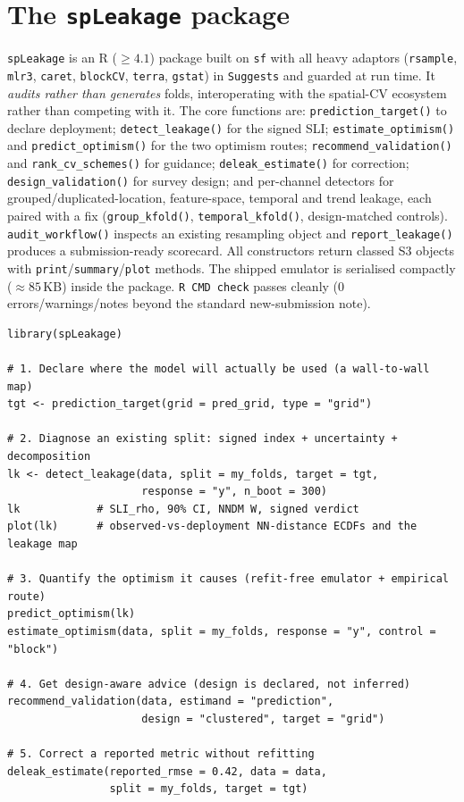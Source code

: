 \documentclass[11pt,a4paper]{article}
\begin{document}
\section{The \texttt{spLeakage} package}\label{sec:software}

\texttt{spLeakage} is an R ($\ge 4.1$) package built on \texttt{sf}
\citep{pebesma2018sf} with all heavy adaptors (\texttt{rsample}, \texttt{mlr3},
\texttt{caret}, \texttt{blockCV}, \texttt{terra}, \texttt{gstat}) in
\texttt{Suggests} and guarded at run time. It \emph{audits rather than generates}
folds, interoperating with the spatial-CV ecosystem rather than competing with it.
The core functions are: \texttt{prediction\_target()} to declare deployment;
\texttt{detect\_leakage()} for the signed SLI; \texttt{estimate\_optimism()} and
\texttt{predict\_optimism()} for the two optimism routes;
\texttt{recommend\_validation()} and \texttt{rank\_cv\_schemes()} for guidance;
\texttt{deleak\_estimate()} for correction; \texttt{design\_validation()} for survey
design; and per-channel detectors for grouped/duplicated-location, feature-space,
temporal and trend leakage, each paired with a fix (\texttt{group\_kfold()},
\texttt{temporal\_kfold()}, design-matched controls). \texttt{audit\_workflow()}
inspects an existing resampling object and \texttt{report\_leakage()} produces a
submission-ready scorecard. All constructors return classed S3 objects with
\texttt{print}/\texttt{summary}/\texttt{plot} methods. The shipped emulator is
serialised compactly ($\approx 85$\,KB) inside the package. \texttt{R CMD check}
passes cleanly (0 errors/warnings/notes beyond the standard new-submission note).

\begin{lstlisting}[caption={A complete audit-quantify-recommend workflow.},captionpos=b]
library(spLeakage)

# 1. Declare where the model will actually be used (a wall-to-wall map)
tgt <- prediction_target(grid = pred_grid, type = "grid")

# 2. Diagnose an existing split: signed index + uncertainty + decomposition
lk <- detect_leakage(data, split = my_folds, target = tgt,
                     response = "y", n_boot = 300)
lk            # SLI_rho, 90% CI, NNDM W, signed verdict
plot(lk)      # observed-vs-deployment NN-distance ECDFs and the leakage map

# 3. Quantify the optimism it causes (refit-free emulator + empirical route)
predict_optimism(lk)
estimate_optimism(data, split = my_folds, response = "y", control = "block")

# 4. Get design-aware advice (design is declared, not inferred)
recommend_validation(data, estimand = "prediction",
                     design = "clustered", target = "grid")

# 5. Correct a reported metric without refitting
deleak_estimate(reported_rmse = 0.42, data = data,
                split = my_folds, target = tgt)
\end{lstlisting}
\end{document}
